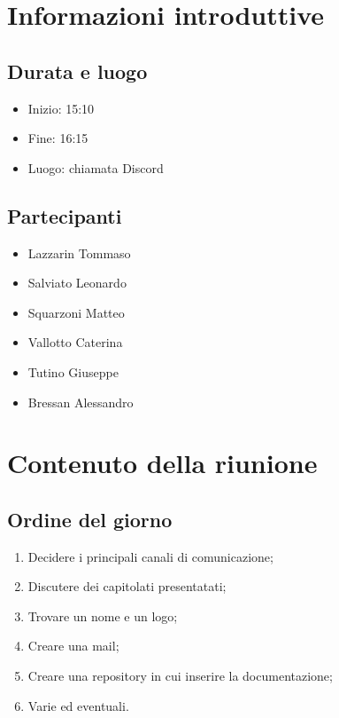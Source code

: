 \documentclass[10pt]{article}
\begin{document}
\newpage
\tableofcontents{\newpage}

\section{Informazioni introduttive}
\subsection{Durata e luogo}
\begin{itemize}
  \item Inizio: 15:10
  \item Fine: 16:15
  \item Luogo: chiamata Discord
\end{itemize}
\subsection{Partecipanti}
\begin{itemize}
  \item Lazzarin Tommaso
  \item Salviato Leonardo
  \item Squarzoni Matteo
  \item Vallotto Caterina
  \item Tutino Giuseppe
  \item Bressan Alessandro
\end{itemize}

\section{Contenuto della riunione}
\subsection{Ordine del giorno}
\begin{enumerate}
  \item Decidere i principali canali di comunicazione;
  \item Discutere dei capitolati presentatati;
  \item Trovare un nome e un logo;
  \item Creare una mail;
  \item Creare una repository in cui inserire la documentazione;
  \item Varie ed eventuali.
\end{enumerate}
\end{document}
